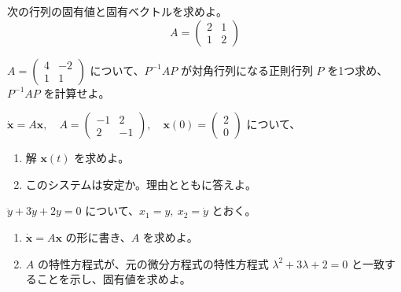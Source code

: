 \documentclass[11pt]{article}
\begin{document}

\problem[固有値の計算]
次の行列の固有値と固有ベクトルを求めよ。
\[ A = \begin{pmatrix} 2 & 1 \\ 1 & 2 \end{pmatrix} \]
\workspace{50mm}

\problem[対角化]
$A = \begin{pmatrix} 4 & -2 \\ 1 & 1 \end{pmatrix}$ について、$P^{-1}AP$ が対角行列になる正則行列 $P$ を1つ求め、$P^{-1}AP$ を計算せよ。
\workspace{60mm}

\newpage
\problem[連立微分方程式と安定性]
$\dot{\boldsymbol x} = A\boldsymbol x,\quad A = \begin{pmatrix} -1 & 2 \\ 2 & -1 \end{pmatrix},\quad \boldsymbol x(0) = \begin{pmatrix} 2 \\ 0 \end{pmatrix}$ について、
\begin{enumerate}[label=(\arabic*)]
\item 解 $\boldsymbol x(t)$ を求めよ。
\item このシステムは安定か。理由とともに答えよ。
\end{enumerate}
\workspace{60mm}

\problem[2階の微分方程式を行列で書く]
$\ddot y + 3\dot y + 2y = 0$ について、$x_1 = y,\ x_2 = \dot y$ とおく。
\begin{enumerate}[label=(\arabic*)]
\item $\dot{\boldsymbol x} = A\boldsymbol x$ の形に書き、$A$ を求めよ。
\item $A$ の特性方程式が、元の微分方程式の特性方程式 $\lambda^2 + 3\lambda + 2 = 0$ と一致することを示し、固有値を求めよ。
\end{enumerate}
\workspace{40mm}
\end{document}
